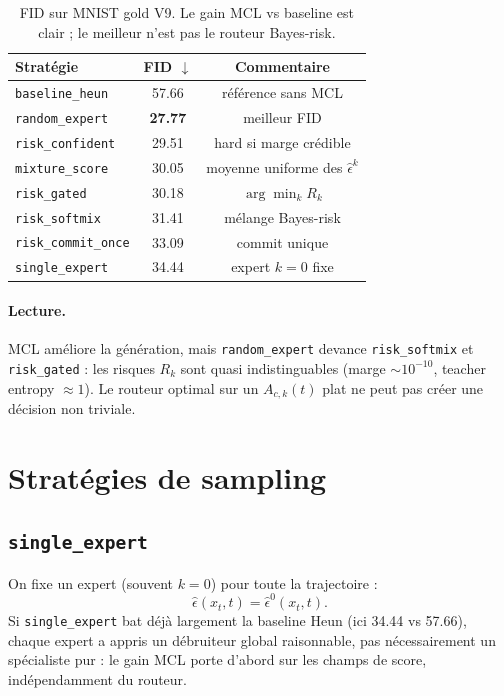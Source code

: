 \documentclass[11pt,a4paper]{article}
\newcommand{\epshat}{\hat{\epsilon}}
\newcommand{\Rk}{R_k}
\begin{document}
\begin{table}[h]
\centering
\begin{tabular}{lcc}
\toprule
Stratégie & FID $\downarrow$ & Commentaire \\
\midrule
\texttt{baseline\_heun} & 57.66 & référence sans MCL \\
\texttt{random\_expert} & \textbf{27.77} & meilleur FID \\
\texttt{risk\_confident} & 29.51 & hard si marge crédible \\
\texttt{mixture\_score} & 30.05 & moyenne uniforme des $\epshat^k$ \\
\texttt{risk\_gated} & 30.18 & $\arg\min_k \Rk$ \\
\texttt{risk\_softmix} & 31.41 & mélange Bayes-risk \\
\texttt{risk\_commit\_once} & 33.09 & commit unique \\
\texttt{single\_expert} & 34.44 & expert $k{=}0$ fixe \\
\bottomrule
\end{tabular}
\caption{FID sur MNIST gold V9. Le gain MCL vs baseline est clair ; le meilleur n'est pas le routeur Bayes-risk.}
\label{tab:fid}
\end{table}

\paragraph{Lecture.}
MCL améliore la génération, mais \texttt{random\_expert} devance \texttt{risk\_softmix} et \texttt{risk\_gated} :
les risques $\Rk$ sont quasi indistinguables (marge $\sim 10^{-10}$, teacher entropy $\approx 1$).
Le routeur optimal sur un $A_{c,k}(t)$ plat ne peut pas créer une décision non triviale.

\section{Stratégies de sampling}

\subsection{\texttt{single\_expert}}

On fixe un expert (souvent $k=0$) pour toute la trajectoire :
\[
\epshat(x_t,t) = \epshat^0(x_t,t).
\]
Si \texttt{single\_expert} bat déjà largement la baseline Heun (ici 34.44 vs 57.66),
chaque expert a appris un débruiteur global raisonnable, pas nécessairement un spécialiste pur :
le gain MCL porte d'abord sur les champs de score, indépendamment du routeur.
\end{document}
